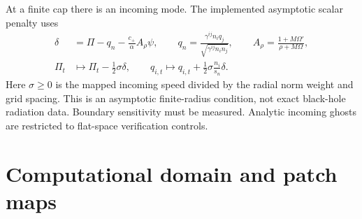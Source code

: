 \documentclass[11pt,letterpaper]{article}
\begin{document}
At a finite cap there is an incoming mode. The implemented asymptotic scalar penalty uses
\begin{align}
 \delta&=\Pi-q_n-\frac{c_+}{\alpha}A_\rho\psi,\qquad
 q_n=\frac{\gamma^{ij}n_iq_j}{\sqrt{\gamma^{ij}n_in_j}},\qquad
 A_\rho=\frac{1+M\Omega'}{\rho+M\Omega},\\
 \Pi_t&\longmapsto\Pi_t-\tfrac12\sigma\delta,\qquad
 q_{i,t}\longmapsto q_{i,t}+\tfrac12\sigma\frac{n_i}{s_n}\delta.
\end{align}
Here $\sigma\geq0$ is the mapped incoming speed divided by the radial norm weight and grid spacing. This is an asymptotic finite-radius condition, not exact black-hole radiation data. Boundary sensitivity must be measured. Analytic incoming ghosts are restricted to flat-space verification controls.

\clearpage
\section{Computational domain and patch maps}
\end{document}
